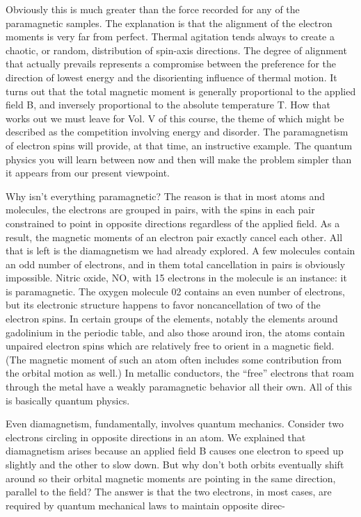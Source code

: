 Obviously this is much greater than the force recorded for any of
the paramagnetic samples. The explanation is that the alignment
of the electron moments is very far from perfect. Thermal agitation
tends always to create a chaotic, or random, distribution of spin-axis
directions. The degree of alignment that actually prevails represents
a compromise between the preference for the direction of lowest
energy and the disorienting influence of thermal motion. It turns
out that the total magnetic moment is generally proportional to the
applied field B, and inversely proportional to the absolute temperature
T. How that works out we must leave for Vol. V of this course,
the theme of which might be described as the competition involving
energy and disorder. The paramagnetism of electron spins will
provide, at that time, an instructive example. The quantum physics
you will learn between now and then will make the problem simpler
than it appears from our present viewpoint.

Why isn't everything paramagnetic? The reason is that in most
atoms and molecules, the electrons are grouped in pairs, with the
spins in each pair constrained to point in opposite directions regardless
of the applied field. As a result, the magnetic moments of an
electron pair exactly cancel each other. All that is left is the 
diamagnetism we had already explored. A few molecules contain an odd
number of electrons, and in them total cancellation in pairs is obviously
impossible. Nitric oxide, NO, with 15 electrons in the molecule
is an instance: it is paramagnetic. The oxygen molecule 02
contains an even number of electrons, but its electronic structure
happens to favor noncancellation of two of the electron spins. In
certain groups of the elements, notably the elements around gadolinium
in the periodic table, and also those around iron, the atoms
contain unpaired electron spins which are relatively free to orient
in a magnetic field. (The magnetic moment of such an atom often
includes some contribution from the orbital motion as well.) In
metallic conductors, the ``free'' electrons that roam through the metal
have a weakly paramagnetic behavior all their own. All of this is
basically quantum physics.

Even diamagnetism, fundamentally, involves quantum mechanics.
Consider two electrons circling in opposite directions in an atom.
We explained that diamagnetism arises because an applied field B
causes one electron to speed up slightly and the other to slow down.
But why don't both orbits eventually shift around so their orbital
magnetic moments are pointing in the same direction, parallel to
the field? The answer is that the two electrons, in most cases, are
required by quantum mechanical laws to maintain opposite direc-


